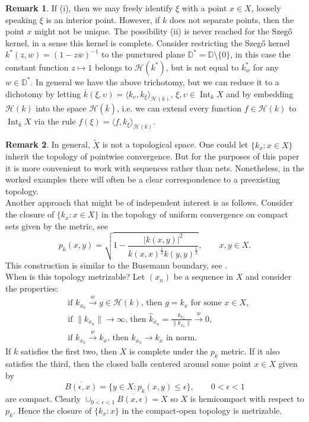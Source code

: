 \documentclass[leqno, final]{article}
\theoremstyle{definition}
\newtheorem{remark}{Remark}
\newcommand{\xto}[1]{\stackrel{#1}{\to}}
\newcommand{\disk}{\mathbb{D}}
\newcommand{\Hilbert}{\mathcal{H}}
\renewcommand{\bar}{\overline}
\newcommand{\la}{\langle}
\newcommand{\ra}{\rangle}
\DeclareMathOperator{\Int}{Int}
\begin{document}
\begin{remark}
If (i), then we may freely identify $\xi$ with a point $x\in X$, loosely speaking
$\xi$ is an interior point. However, if $k$ does not separate points, then the point $x$ might not be unique.
The possibility (ii) is never reached for the Szeg\H{o} kernel, in a sense this kernel is
complete. Consider restricting the Szeg\H{o} kernel $k^*(z,w)=(1-z\bar w)^{-1}$
to the punctured plane $\disk^* = \disk\setminus\{0\}$, in this case the constant function
$z\mapsto1$ belongs to $\Hilbert(k^*)$, but is not equal to $k^*_w$ for any $w\in\disk^*$.
In general we have the above trichotomy, but we can reduce it to a dichotomy by letting
$\bar k(\xi,\upsilon) = \la k_\upsilon, k_\xi\ra_{\Hilbert(k)},\,\xi,\upsilon\in\Int_kX$
and by embedding $\Hilbert(k)$ into the space $\Hilbert(\bar k)$, i.e. we can extend every function $f\in\Hilbert(k)$ to
$\Int_kX$ via the rule $f(\xi) = \la f, k_\xi\ra_{\Hilbert(k)}$.
\end{remark}
\begin{remark}\label{remark:topology}
In general, $\widetilde X$ is not a topological space. One could let $\{k_x:x\in X\}$
inherit the topology of pointwise convergence. But for the purposes of
this paper it is more convenient to work with sequences rather than nets.
Nonetheless, in the worked examples there will often be a clear correspondence
to a preexisting topology. \\ Another approach that might be of independent
interest is as follows. Consider the closure of $\{k_x:x\in X\}$ in the topology
of uniform convergence on compact sets given by the metric, see \cite{agler-mccarthy_cnp}
\begin{equation}\label{equation:p-metric}
	p_k(x,y)
	= \sqrt{1-\frac{|k(x,y)|^2}{k(x,x)^\frac12 k(y,y)^\frac12}}, \qquad x,y\in X.
\end{equation}
This construction is similar to the Busemann boundary, see \cite{bracci_boundary}.
\\ When is this topology metrizable?
Let $(x_n)$ be a sequence in $X$ and consider the properties: \begin{align}
	&\text{if $k_{x_n}\xto{w}g\in\Hilbert(k)$, then $g=k_x$ for some $x\in X$,} \\
	&\text{if $\|k_{x_n}\|\to\infty$, then $\hat k_{x_n} = \frac{k_{x_n}}{\|k_{x_n}\|}\xto{w}0$,} \\
	&\text{if $k_{x_n}\xto{w}k_x$, then $k_{x_n}\to k_x$ in norm.}
\end{align}
If $k$ satisfies the first two, then $X$ is complete under the $p_k$ metric.
If it also satisfies the third, then the closed balls centered around some
point $x\in X$ given by \[
	\overline{B(\epsilon,x)} = \{y\in X:p_k(x,y)\leq\epsilon\}, \qquad 0<\epsilon<1
\]
are compact. Clearly $\cup_{0<\epsilon<1}\overline{B(x,\epsilon)} = X$ so $X$ is
hemicompact with respect to $p_k$. Hence the closure of $\{k_x:x\}$ in the
compact-open topology is metrizable.
\end{remark}
\end{document}
